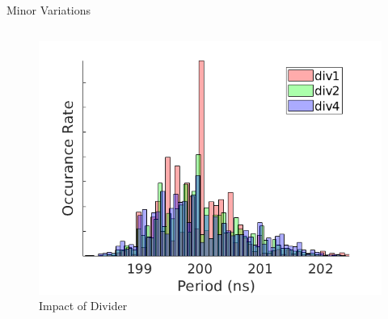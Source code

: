 \documentclass{beamer}
\begin{document}
\begin{frame}{Minor Variations}
\begin{columns}
\begin{figure}
			\includegraphics[width=\linewidth]{../dist_2}
			\vspace{-0.8 cm}
			\caption{Impact of Divider}
		\end{figure}
	\end{columns}	
\end{frame}
\end{document}
